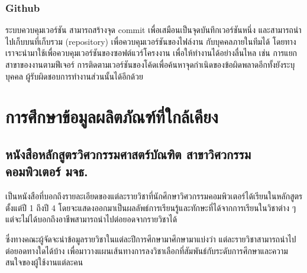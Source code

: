 \subsubsection{Github}
ระบบควบคุมเวอร์ชัน สามารถสร้างจุด commit เพื่อเสมือนเป็นจุดบันทึกเวอร์ชันหนึ่ง
และสามารถนำไปเก็บบนที่เก็บรวม (repository) เพื่อควบคุมเวอร์ชันของไฟล์งาน
กับบุคคลภายในทีมได้ โดยทางเราจะนำมาใช้เพื่อควบคุมเวอร์ชันของซอฟต์แวร์โครงงาน
เพื่อให้ทำงานได้อย่างลื่นไหล เช่น การแยกสาขาของงานตามฟีเจอร์
การติดตามเวอร์ชันของโค้ดเพื่อค้นหาจุดกำเนิดของข้อผิดพลาดอีกทั้งยังระบุบุคคล
ผู้รับผิดชอบการทำงานส่วนนั้นได้อีกด้วย
\section{การศึกษาข้อมูลผลิตภัณฑ์ที่ใกล้เคียง}
\subsection{หนังสือหลักสูตรวิศวกรรมศาสตร์บัณฑิต สาขาวิศวกรรมคอมพิวเตอร์ มจธ.}
เป็นหนังสือที่บอกถึงรายละเอียดของแต่ละรายวิชาที่นักศึกษาวิศวกรรมคอมพิวเตอร์ได้เรียนในหลักสูตรตั้งแต่ปี 1 ถึงปี 4
โดยจะแสดงออกมาเป็นผลลัพธ์การเรียนรู้และทักษะที่ได้จากการเรียนในวิชาต่าง ๆ แต่จะไม่ได้บอกถึงอาชีพสามารถนำไปต่อยอดจากรายวิชาได้
\par ซึ่งทางคณะผู้จัดจะนำข้อมูลรายวิชาในแต่ละปีการศึกษามาศึกษามาแบ่งว่า แต่ละรายวิชาสามารถนำไปต่อยอดทางใดได้บ้าง
เพื่อมาวางแผนเส้นทางการลงวิชาเลือกที่สัมพันธ์กับระดับการศึกษาและความสนใจของผู้ใช้งานแต่ละคน

